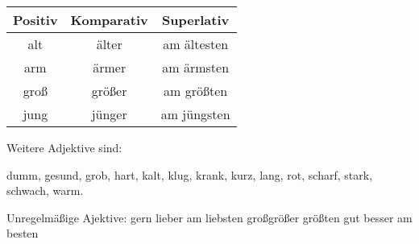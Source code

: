 \begin{tabular}{|c|c|c|}
\hline
Positiv & Komparativ & Superlativ \\
\hline
alt & \"alter & am \"altesten \\
arm & \"armer & am \"armsten \\
gro\ss & gr\"o\ss er & am gr\"o\ss ten \\
jung & j\"unger & am j\"ungsten \\
\hline
\end {tabular}

Weitere Adjektive sind:

dumm, gesund, grob, hart, kalt, klug, krank, kurz, lang, rot, scharf, stark, schwach, warm. 

Unregelm\"a\ss ige Ajektive:
gern lieber am liebsten
gro\ss gr\"o\ss er gr\"o\ss ten
gut besser am besten

